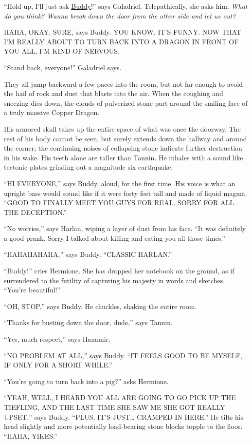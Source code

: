\documentclass[smalldemyvopaper,11pt,twoside,onecolumn,openright,extrafontsizes]{memoir}
\newlength\drop
\begin{document}
``Hold up, I'll just ask \href{/characters/buddy/}{Buddy}!'' says
Galadriel. Telepathically, she asks him. \emph{What do you think? Wanna
break down the door from the other side and let us out?}

HAHA, OKAY, SURE, says Buddy. YOU KNOW, IT'S FUNNY. NOW THAT I'M REALLY
ABOUT TO TURN BACK INTO A DRAGON IN FRONT OF YOU ALL, I'M KIND OF
NERVOUS.

``Stand back, everyone!'' Galadriel says.

They all jump backward a few paces into the room, but not far enough to
avoid the hail of rock and dust that blasts into the air. When the
coughing and sneezing dies down, the clouds of pulverized stone part
around the smiling face of a truly massive Copper Dragon.

His armored skull takes up the entire space of what was once the
doorway. The rest of his body cannot be seen, but surely extends down
the hallway and around the corner; the continuing noises of collapsing
stone indicate further destruction in his wake. His teeth alone are
taller than Tannin. He inhales with a sound like tectonic plates
grinding out a magnitude six earthquake.

``HI EVERYONE,'' says Buddy, aloud, for the first time. His voice is
what an upright bass would sound like if it were forty feet tall and
made of liquid magma. ``GOOD TO FINALLY MEET YOU GUYS FOR REAL. SORRY
FOR ALL THE DECEPTION.''

``No worries,'' says Harlan, wiping a layer of dust from his face. ``It
was definitely a good prank. Sorry I talked about killing and eating you
all those times.''

``HAHAHAHAHA,'' says Buddy. ``CLASSIC HARLAN.''

``Buddy!'' cries Hermione. She has dropped her notebook on the ground,
as if surrendered to the futility of capturing his majesty in words and
sketches. ``You're beautiful!''

``OH, STOP,'' says Buddy. He chuckles, shaking the entire room.

``Thanks for busting down the door, dude,'' says Tannin.

``Yes, much respect,'' says Hanamir.

``NO PROBLEM AT ALL,'' says Buddy. ``IT FEELS GOOD TO BE MYSELF, IF ONLY
FOR A SHORT WHILE.''

``You're going to turn back into a pig?'' asks Hermione.

``YEAH, WELL, I HEARD YOU ALL ARE GOING TO GO PICK UP THE TIEFLING, AND
THE LAST TIME SHE SAW ME SHE GOT REALLY UPSET,'' says Buddy. ``PLUS,
IT'S JUST\ldots{} CRAMPED IN HERE.'' He tilts his head slightly and more
potentially load-bearing stone blocks topple to the floor. ``HAHA,
YIKES.''
\end{document}

